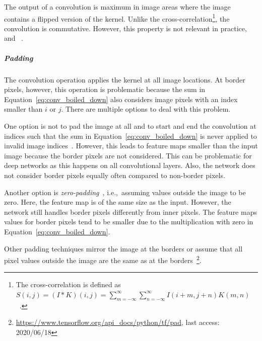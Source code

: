 The output of a convolution is maximum in image areas where the image contains a flipped version of the kernel.
Unlike the cross-correlation\footnote{The cross-correlation is defined as $S(i, j)=(I * K)(i, j)=\sum_{m=-\infty}^{\infty} \sum_{n=-\infty}^{\infty} I(i+m, j+n) K(m, n)$~\citep[p. 329]{Goodfellow-et-al-2016}.}, the convolution is commutative.
However, this property is not relevant in practice, and ~\citep[p. 329]{Goodfellow-et-al-2016}.

\subparagraph{Padding}
The convolution operation applies the kernel at all image locations.
At border pixels, however, this operation is problematic because the sum in Equation~\ref{eq:conv_boiled_down} also considers image pixels with an index smaller than $i$ or $j$.
There are multiple options to deal with this problem.

One option is not to pad the image at all and to start and end the convolution at indices such that the sum in Equation~\ref{eq:conv_boiled_down} is never applied to invalid image indices~\citep[p. 350]{Goodfellow-et-al-2016}.
However, this leads to feature maps smaller than the input image because the border pixels are not considered.
This can be problematic for deep networks as this happens on all convolutional layers.
Also, the network does not consider border pixels equally often compared to non-border pixels.

Another option is \textit{zero-padding}~\citep[p. 350]{Goodfellow-et-al-2016}, i.e.,~assuming values outside the image to be zero.
Here, the feature map is of the same size as the input.
However, the network still handles border pixels differently from inner pixels.
The feature maps values for border pixels tend to be smaller due to the multiplication with zero in Equation~\ref{eq:conv_boiled_down}.

Other padding techniques mirror the image at the borders or assume that all pixel values outside the image are the same as at the borders~\footnote{\href{https://www.tensorflow.org/api\_docs/python/tf/pad}{https://www.tensorflow.org/api\_docs/python/tf/pad}, last access: 2020/06/18}.

